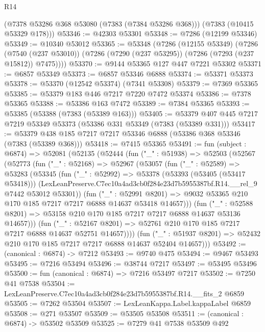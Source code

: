 \begin{lexlean}{R14}
\begin{coremodule}
      (@7378 @53286 @368 @53080 (@7383 (@7384 @53286 @368)))
      (@7383 (@10415 @53329 @178)))
@53346 := @42303 @53301
@53348 := @7286 (@12199 @53346)
@53349 := @10340 @53012
@53365 := @53348
    (@7286
      (@12155 @53349)
      (@7286
        (@7540 (@237 @53010))
        (@7286 (@7290 (@237 @53295)) (@7286 (@7293 (@237 @15812)) @7475))))
@53370 := @9144 @53365 @127 @447 @7221 @53302
@53371 := @6857 @53349
@53373 := @6857 @53346 @6888
@53374 := @53371 @53373
@53378 := @53370 (@12542 @53374) (@7341 @53308)
@53379 := @7369 @53365
@53385 := @53379 @183 @446 @7217 @7220 @7472 @53374
@53386 := @7378 @53365
@53388 := @53386 @163 @7472
@53389 := @7384 @53365
@53393 := @53385 (@53388 (@7383 (@53389 @163)))
@53405 := @53379 @407 @445 @7217 @7219 @53349 @53373 (@53386 @331 @53349 (@7383 (@53389 @331)))
@53417 := @53379 @438 @185 @7217 @7217 @53346 @6888 (@53386 @368 @53346 (@7383 (@53389 @368)))
@53418 := @7415 @53365
@53491 := fun (subject : @6874) =>
  @52081
    (@52135
      (@52444
        (fun ("_" : @51938) =>
        @52503
          (@52567
            (@52773
              (fun ("_" : @52168) =>
              @52967
                (@53057
                  (fun ("_" : @52589) =>
                  @53283
                    (@53345
                      (fun ("_" : @52992) =>
                      @53378
                        (@53393 (@53405 (@53417 @53418)))
                        (LexLeanPreserve.C7ec10a4ad3cb0f284e23d7b5955387bf.R14.__rel_9
                          @7442
                          @53012
                          @53301))
                      (fun ("_" : @52991 @8201) =>
                      @9032 @53365 @210 @170 @185 @7217 @7217 @6888 @14637 @53418 @14657)))
                  (fun ("_" : @52588 @8201) =>
                  @53158 @210 @170 @185 @7217 @7217 @6888 @14637 @53136 @14657)))
              (fun ("_" : @52167 @8201) =>
              @52761 @210 @170 @185 @7217 @7217 @6888 @14637 @52751 @14657))))
        (fun ("_" : @51937 @8201) => @52432 @210 @170 @185 @7217 @7217 @6888 @14637 @52404 @14657)))
@53492 := (canonical : @6874) -> @7212
@53493 := @9740 @475
@53494 := @9467 @53493
@53495 := @7216 @53494
@53496 := @38744 @7217
@53497 := @53495 @53496
@53500 := fun (canonical : @6874) => @7216 @53497 @7217
@53502 := @7250 @41 @7538
@53504 := LexLeanPreserve.C7ec10a4ad3cb0f284e23d7b5955387bf.R14.__fits_2 @6859
@53505 := @7262 @53504
@53507 := LexLeanKappa.Label.kappaLabel @6859
@53508 := @271 @53507
@53509 := @53505 @53508
@53511 := (canonical : @6874) -> @53502 @53509
@53525 := @7279
    @41
    @7538
    @53509
    @492

\end{coremodule}
\end{lexlean}

